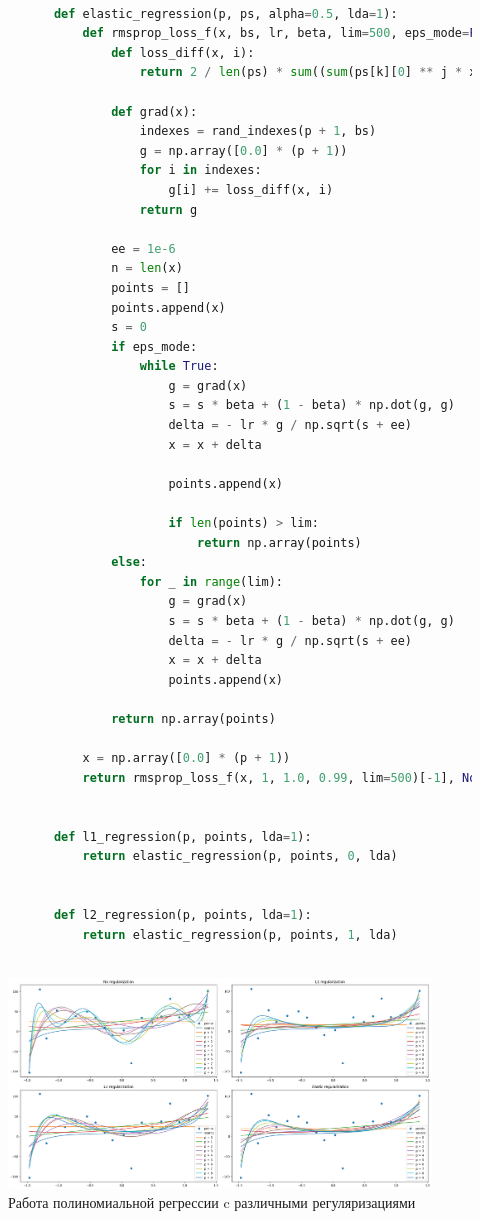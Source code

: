 \documentclass[a4paper,14pt,oneside,openany]{memoir}
\begin{document}
	\begin{lstlisting}[language=Python, caption=Реализация полиномиальных регрессий с регуляризациями]
			
			def elastic_regression(p, ps, alpha=0.5, lda=1):
			    def rmsprop_loss_f(x, bs, lr, beta, lim=500, eps_mode=False):
			        def loss_diff(x, i):
			            return 2 / len(ps) * sum((sum(ps[k][0] ** j * x[j] for j in range(p + 1)) - ps[k][1]) * ps[k][0] ** i for k in range(len(ps))) + lda * (alpha + (1 - alpha) * x[i])
			
			        def grad(x):
			            indexes = rand_indexes(p + 1, bs)
			            g = np.array([0.0] * (p + 1))
			            for i in indexes:
			                g[i] += loss_diff(x, i)
			            return g
			
			        ee = 1e-6
			        n = len(x)
			        points = []
			        points.append(x)
			        s = 0
			        if eps_mode:
			            while True:
			                g = grad(x)
			                s = s * beta + (1 - beta) * np.dot(g, g)
			                delta = - lr * g / np.sqrt(s + ee)
			                x = x + delta
			
			                points.append(x)
			
			                if len(points) > lim:
			                    return np.array(points)
			        else:
			            for _ in range(lim):
			                g = grad(x)
			                s = s * beta + (1 - beta) * np.dot(g, g)
			                delta = - lr * g / np.sqrt(s + ee)
			                x = x + delta
			                points.append(x)
			
			        return np.array(points)
			
			    x = np.array([0.0] * (p + 1))
			    return rmsprop_loss_f(x, 1, 1.0, 0.99, lim=500)[-1], None
			
			
			def l1_regression(p, points, lda=1):
			    return elastic_regression(p, points, 0, lda)
			
			
			def l2_regression(p, points, lda=1):
			    return elastic_regression(p, points, 1, lda)
			
		\end{lstlisting}
		
		\begin{figure}[ht]
				\centering
				\includegraphics[width=1\textwidth]{img/4_2.png}
			    \caption{Работа полиномиальной регрессии c различными регуляризациями}
			\end{figure}
			
\end{document}
